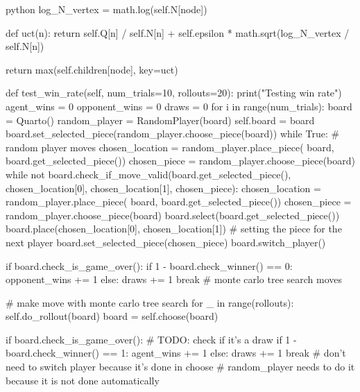 \begin{mintedbox}{python}
        log_N_vertex = math.log(self.N[node])

        def uct(n):
            return self.Q[n] / self.N[n] + self.epsilon * math.sqrt(log_N_vertex / self.N[n])

        return max(self.children[node], key=uct)

    def test_win_rate(self, num_trials=10, rollouts=20):
        print("Testing win rate")
        agent_wins = 0
        opponent_wins = 0
        draws = 0
        for i in range(num_trials):
            board = Quarto()
            random_player = RandomPlayer(board)
            self.board = board
            board.set_selected_piece(random_player.choose_piece(board))
            while True:
                # random player moves
                chosen_location = random_player.place_piece(
                    board, board.get_selected_piece())
                chosen_piece = random_player.choose_piece(board)
                while not board.check_if_move_valid(board.get_selected_piece(), chosen_location[0], chosen_location[1], chosen_piece):
                    chosen_location = random_player.place_piece(
                        board, board.get_selected_piece())
                    chosen_piece = random_player.choose_piece(board)
                board.select(board.get_selected_piece())
                board.place(chosen_location[0], chosen_location[1])
                # setting the piece for the next player
                board.set_selected_piece(chosen_piece)
                board.switch_player()

                if board.check_is_game_over():
                    if 1 - board.check_winner() == 0:
                        opponent_wins += 1
                    else:
                        draws += 1
                    break
                # monte carlo tree search moves

                # make move with monte carlo tree search
                for _ in range(rollouts):
                    self.do_rollout(board)
                board = self.choose(board)

                if board.check_is_game_over():
                    # TODO: check if it's a draw
                    if 1 - board.check_winner() == 1:
                        agent_wins += 1
                    else:
                        draws += 1
                    break
                # don't need to switch player because it's done in choose
                # random_player needs to do it because it is not done automatically


\end{mintedbox}
